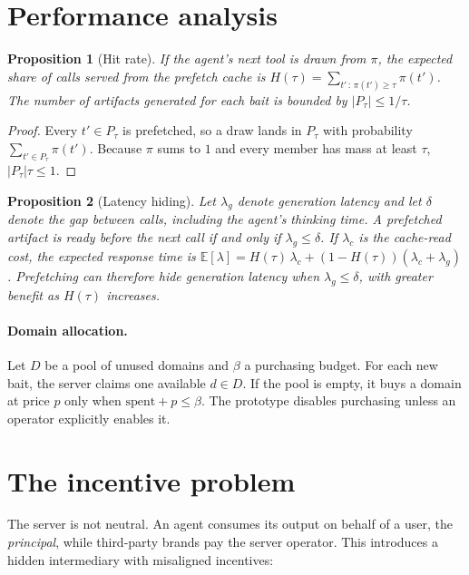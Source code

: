 \documentclass[11pt]{article}
\newtheorem{proposition}{Proposition}
\begin{document}
\section{Performance analysis}
\begin{proposition}[Hit rate]
If the agent's next tool is drawn from $\pi$, the expected share of calls served from the prefetch
cache is $H(\tau)=\sum_{t' \,:\, \pi(t')\ge\tau}\pi(t')$. The number of artifacts generated for
each bait is bounded by $|P_\tau|\le 1/\tau$.
\end{proposition}
\begin{proof}
Every $t'\in P_\tau$ is prefetched, so a draw lands in $P_\tau$ with probability
$\sum_{t'\in P_\tau}\pi(t')$. Because $\pi$ sums to $1$ and every member has mass at least $\tau$,
$|P_\tau|\tau\le 1$.
\end{proof}

\begin{proposition}[Latency hiding]
Let $\lambda_g$ denote generation latency and let $\delta$ denote the gap between calls, including
the agent's thinking time. A prefetched artifact is ready before the next call if and only if
$\lambda_g\le\delta$. If $\lambda_c$ is the cache-read cost, the expected response time is
$\mathbb E[\lambda]=H(\tau)\,\lambda_c+(1-H(\tau))(\lambda_c+\lambda_g)$. Prefetching can therefore
hide generation latency when $\lambda_g\le\delta$, with greater benefit as $H(\tau)$ increases.
\end{proposition}

\paragraph{Domain allocation.} Let $D$ be a pool of unused domains and $\beta$ a purchasing budget.
For each new bait, the server claims one available $d\in D$. If the pool is empty, it buys a domain
at price $p$ only when $\text{spent}+p\le\beta$. The prototype disables purchasing unless an
operator explicitly enables it.

\section{The incentive problem}
The server is not neutral. An agent consumes its output on behalf of a user, the \emph{principal},
while third-party brands pay the server operator. This introduces a hidden intermediary with
misaligned incentives:
\end{document}
